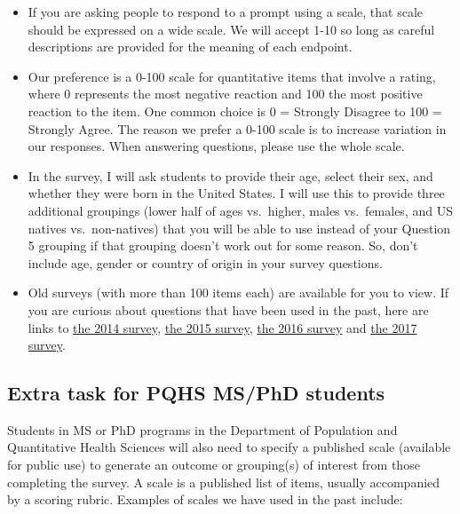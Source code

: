 \documentclass[]{book}
\providecommand{\tightlist}{%
  \setlength{\itemsep}{0pt}\setlength{\parskip}{0pt}}
\theoremstyle{definition}
\theoremstyle{definition}
\theoremstyle{definition}
\theoremstyle{remark}
\begin{document}
\begin{itemize}
\tightlist
\item
  If you are asking people to respond to a prompt using a scale, that
  scale should be expressed on a wide scale. We will accept 1-10 so long
  as careful descriptions are provided for the meaning of each endpoint.
\item
  Our preference is a 0-100 scale for quantitative items that involve a
  rating, where 0 represents the most negative reaction and 100 the most
  positive reaction to the item. One common choice is 0 = Strongly
  Disagree to 100 = Strongly Agree. The reason we prefer a 0-100 scale
  is to increase variation in our responses. When answering questions,
  please use the whole scale.
\item
  In the survey, I will ask students to provide their age, select their
  sex, and whether they were born in the United States. I will use this
  to provide three additional groupings (lower half of ages vs.~higher,
  males vs.~females, and US natives vs.~non-natives) that you will be
  able to use instead of your Question 5 grouping if that grouping
  doesn't work out for some reason. So, don't include age, gender or
  country of origin in your survey questions.
\item
  Old surveys (with more than 100 items each) are available for you to
  view. If you are curious about questions that have been used in the
  past, here are links to
  \href{https://docs.google.com/a/case.edu/forms/d/e/1FAIpQLScEgrawEzqKZNyYQZj3_AvqOzo8ay5NpqvEIg-Bwpcg2fqMKw/viewform?c=0\&w=1}{the
  2014 survey},
  \href{https://docs.google.com/a/case.edu/forms/d/e/1FAIpQLSduLMePv2ZGnjL8zM9a2p_H8JS1-ux0W1Xe3A6iDZW5MxJnMA/viewform}{the
  2015 survey},
  \href{https://github.com/THOMASELOVE/431project-2017/blob/master/TaskB/2016_431_class_survey.pdf}{the
  2016 survey} and
  \href{https://github.com/THOMASELOVE/431project-2017/blob/master/TaskC/2017-10-31_final_version_classprojectsurvey.pdf}{the
  2017 survey}.
\end{itemize}

\hypertarget{extra-task-for-pqhs-msphd-students}{%
\subsection{Extra task for PQHS MS/PhD
students}\label{extra-task-for-pqhs-msphd-students}}

Students in MS or PhD programs in the Department of Population and
Quantitative Health Sciences will also need to specify a published scale
(available for public use) to generate an outcome or grouping(s) of
interest from those completing the survey. A scale is a published list
of items, usually accompanied by a scoring rubric. Examples of scales we
have used in the past include:
\end{document}
